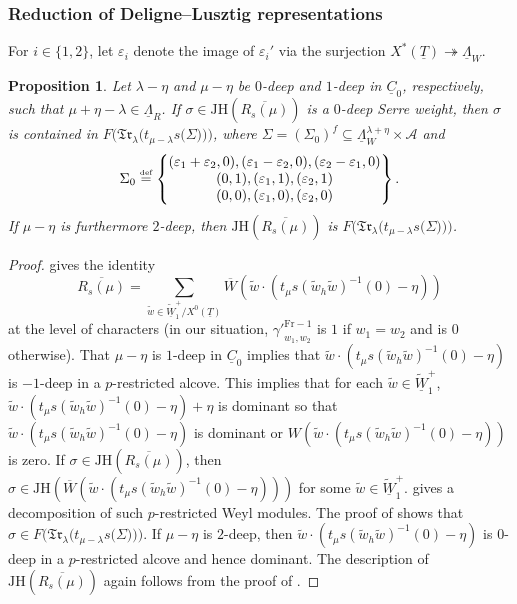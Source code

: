 \documentclass[oneside,a4paper,english, 11pt]{amsart}
\theoremstyle{plain}
\theoremstyle{plain}
\newtheorem{prop}[thm]{Proposition}
\theoremstyle{plain}
\theoremstyle{plain}
\theoremstyle{plain}
\theoremstyle{plain}
\theoremstyle{definition}
\theoremstyle{definition}
\theoremstyle{definition}
\theoremstyle{remark}
\numberwithin{equation}{section}
\newcommand{\eps}{\varepsilon}
\newcommand{\La}{\Lambda}
\newcommand{\un}[1]{\underline{#1}}
\newcommand{\tld}[1]{\widetilde{#1}}
\newcommand{\JH}{\mathrm{JH}}
\newcommand{\defeq}{\stackrel{\textrm{\tiny{def}}}{=}}
\newcommand{\ovl}[1]{\overline{#1}}
\newcommand{\onto}{\twoheadrightarrow}
\begin{document}
%
%
%
%
%
%
%
%
%
%


%
%

%
%
%
%
%
%
%
%
%
%
%
%

\subsubsection{Reduction of Deligne--Lusztig representations}\label{sec:reduction}

For $i\in\{1,2\}$, let $\eps_i$ denote the image of $\eps_i'$ via the surjection $X^*(\un{T})\onto \un{\La}_W$.

\begin{prop}\label{prop:JH}
Let $\lambda-\eta$ and $\mu-\eta$ be $0$-deep and $1$-deep in $\un{C}_0$, respectively, such that $\mu+\eta-\lambda\in \un{\Lambda}_R$. 
If $\sigma \in \JH(\ovl{R_s(\mu)})$ is a $0$-deep Serre weight, then $\sigma$ is contained in $F\Big(\mathfrak{Tr}_{\lambda}\big(t_{\mu-\lambda}s\big(\Sigma\big)\big)\Big)$, where $\Sigma=(\Sigma_0)^{f}\subseteq \un{\Lambda}^{\lambda+\eta}_W\times\mathcal{A}$ and
%
\[
\Sigma_0 \defeq  \begin{Bmatrix} (\eps_1+ \eps_2, 0), (\eps_1 - \eps_2, 0), (\eps_2 - \eps_1, 0) \\
 (0, 1) , (\eps_1, 1), (\eps_2, 1) \\
 (0, 0), (\eps_1, 0), (\eps_2, 0) 
 \end{Bmatrix}.
 \]
If $\mu-\eta$ is furthermore $2$-deep, then $\JH(\ovl{R_s(\mu)})$ is $F\Big(\mathfrak{Tr}_{\lambda}\big(t_{\mu-\lambda}s\big(\Sigma\big)\big)\Big)$. 
\end{prop}
\begin{proof}
\cite[Appendix, Theorem 3.4]{herzig-duke} gives the identity 
\[
\ovl{R_s(\mu)} = \sum_{\tld{w} \in \tld{\un{W}}_1^+/X^0(\un{T})} \ovl{W}(\tld{w} \cdot (t_\mu s (\tld{w}_h\tld{w})^{-1}(0) - \eta))
\]
at the level of characters (in our situation, ${\gamma'}^{\mathrm{Fr-}1}_{w_1,w_2}$ is $1$ if  $w_1=w_2$ and is $0$ otherwise). 
That $\mu - \eta$ is $1$-deep in $\un{C}_0$ implies that $\tld{w} \cdot (t_\mu s (\tld{w}_h\tld{w})^{-1}(0) - \eta)$ is $-1$-deep in a $p$-restricted alcove. 
This implies that for each $\tld{w} \in \tld{\un{W}}_1^+$, $\tld{w} \cdot (t_\mu s (\tld{w}_h\tld{w})^{-1}(0) - \eta)+\eta$ is dominant so that $\tld{w} \cdot (t_\mu s (\tld{w}_h\tld{w})^{-1}(0) - \eta)$ is dominant or $W(\tld{w} \cdot (t_\mu s (\tld{w}_h\tld{w})^{-1}(0) - \eta))$ is zero. 
If $\sigma \in \JH(\ovl{R_s(\mu)})$, then $\sigma \in \JH(\ovl{W}(\tld{w} \cdot (t_\mu s (\tld{w}_h\tld{w})^{-1}(0) - \eta)))$ for some $\tld{w} \in \tld{\un{W}}_1^+$. 
\cite[Proposition 4.9]{florian-thesis} gives a decomposition of such $p$-restricted Weyl modules. 
The proof of \cite[Proposition~2.3.4]{LLLM2} shows that $\sigma\in F\Big(\mathfrak{Tr}_{\lambda}\big(t_{\mu-\lambda}s\big(\Sigma\big)\big)\Big)$. 
If $\mu-\eta$ is $2$-deep, then $\tld{w} \cdot (t_\mu s (\tld{w}_h\tld{w})^{-1}(0) - \eta)$ is $0$-deep in a $p$-restricted alcove and hence dominant. 
The description of $\JH(\ovl{R_s(\mu)})$ again follows from the proof of \cite[Proposition~2.3.4]{LLLM2}. 
\end{proof}
\end{document}
